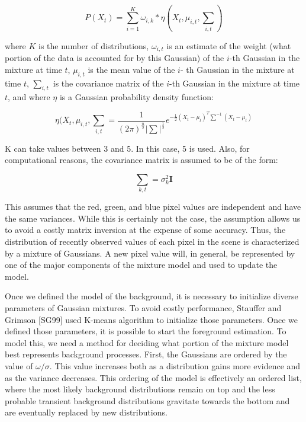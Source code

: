 \documentclass[12pt]{article} %
\begin{document}
\begin{equation}
{P(X_{t}) = \sum_{i=1}^{K}\omega_{i,k} \ast \eta(X_{t},\mu_{i,t}, \sum_{i,t})}
\end{equation}

where $K$ is the number of distributions, $\omega_{i,t}$ is an estimate
of the weight (what portion of the data is accounted for by this Gaussian) of the $i$-th Gaussian in the mixture at time $t$, $\mu_{i,t}$ is the mean value of the $i$- th Gaussian in the mixture at time $t$, $\sum_{i,t}$ is the covariance matrix of the $i$-th Gaussian in the mixture at time $t$, and where $\eta$ is a Gaussian probability density function:

\begin{equation}
\eta(X_{t},\mu_{i,t}, \sum_{i,t} = \frac{1}{(2\pi)^{\frac{n}{2}}|\sum|^{\frac{1}{2}}} e^{-\frac{1}{2}(X_{t}-\mu_{t})^{T}\sum^{-1}(X_{t}-\mu_{t})}
\end{equation}

K can take values between 3 and 5. In this case, 5 is used. Also, for computational reasons, the covariance matrix is assumed to be of the form:

\begin{equation}
{\sum_{k,t} = \sigma_{k}^{2}\textbf{I}}
\end{equation}

This assumes that the red, green, and blue pixel values are independent and have the same variances. While this is certainly not the case, the assumption allows us to avoid a costly matrix inversion at the expense of some accuracy. 
Thus, the distribution of recently observed values
of each pixel in the scene is characterized by a mixture of Gaussians. A new pixel value will, in general, be represented by one of the major components of the mixture model and used to update the model. 

Once we defined the model of the background, it is necessary to initialize diverse parameters of Gaussian mixtures. To avoid costly performance, Stauffer and Grimson [SG99] used K-means algorithm to initialize those parameters. Once we defined those parameters, it is possible to start the foreground estimation. To model this, we need
a method for deciding what portion of the mixture
model best represents background processes. First, the Gaussians are ordered by the value of
${\omega/\sigma}$. This value increases both as a distribution gains more evidence and as the variance decreases. This ordering of the model is effectively an ordered list, where the most likely background distributions remain on top and the less probable transient background distributions gravitate towards the bottom and are eventually replaced by new distributions.
\end{document}
